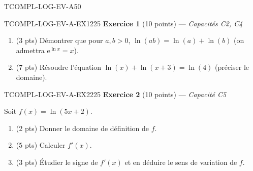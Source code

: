 

\begin{evaluation}{TCOMPL-LOG-EV-A}{50}

\begin{exercice}{TCOMPL-LOG-EV-A-EX1}{2}{25}
\textbf{Exercice 1} (10 points) --- \textit{Capacités C2, C4}

\medskip

\begin{enumerate}
  \item (3 pts) Démontrer que pour $a,b>0$, $\ln(ab) = \ln(a)+\ln(b)$ (on admettra $\mathrm{e}^{\ln x}=x$).
  \item (7 pts) Résoudre l'équation $\ln(x) + \ln(x+3) = \ln(4)$ (préciser le domaine).
\end{enumerate}
\end{exercice}

\begin{exercice}{TCOMPL-LOG-EV-A-EX2}{2}{25}
\textbf{Exercice 2} (10 points) --- \textit{Capacité C5}

\medskip

Soit $f(x) = \ln(5x+2)$.
\begin{enumerate}
  \item (2 pts) Donner le domaine de définition de $f$.
  \item (5 pts) Calculer $f'(x)$.
  \item (3 pts) Étudier le signe de $f'(x)$ et en déduire le sens de variation de $f$.
\end{enumerate}
\end{exercice}

\end{evaluation}

